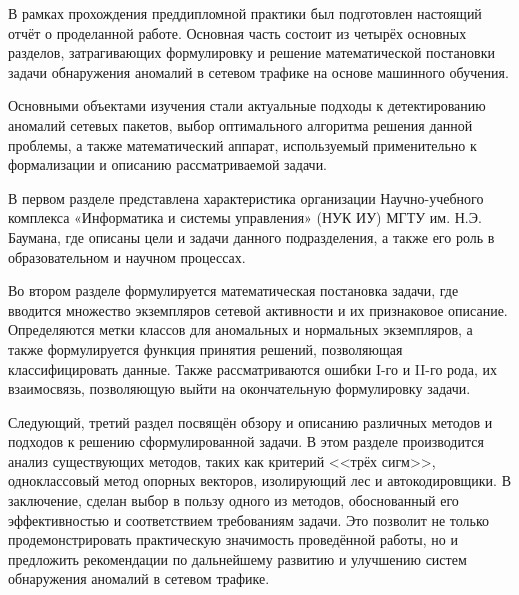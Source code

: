 
В рамках прохождения преддипломной практики был подготовлен настоящий отчёт о проделанной работе. Основная часть состоит из четырёх основных разделов, затрагивающих формулировку и решение математической постановки задачи обнаружения аномалий в сетевом трафике на основе машинного обучения.

Основными объектами изучения стали актуальные подходы к детектированию аномалий сетевых пакетов, выбор оптимального алгоритма решения данной проблемы, а также математический аппарат, используемый применительно к формализации и описанию рассматриваемой задачи.

В первом разделе представлена характеристика организации Научно-учебного комплекса «Информатика и системы управления» (НУК ИУ) МГТУ им. Н.Э. Баумана, где описаны цели и задачи данного подразделения, а также его роль в образовательном и научном процессах.

Во втором разделе формулируется математическая постановка задачи, где вводится множество экземпляров сетевой активности и их признаковое описание. Определяются метки классов для аномальных и нормальных экземпляров, а также формулируется функция принятия решений, позволяющая классифицировать данные. Также рассматриваются ошибки I-го и II-го рода, их взаимосвязь, позволяющую выйти на окончательную формулировку задачи. 

Следующий, третий раздел посвящён обзору и описанию различных методов и подходов к решению сформулированной задачи. В этом разделе производится анализ существующих методов, таких как критерий <<трёх сигм>>, одноклассовый метод опорных векторов, изолирующий лес и автокодировщики. В заключение, сделан выбор в пользу одного из методов, обоснованный его эффективностью и соответствием требованиям задачи. Это позволит не только продемонстрировать практическую значимость проведённой работы, но и предложить рекомендации по дальнейшему развитию и улучшению систем обнаружения аномалий в сетевом трафике.
